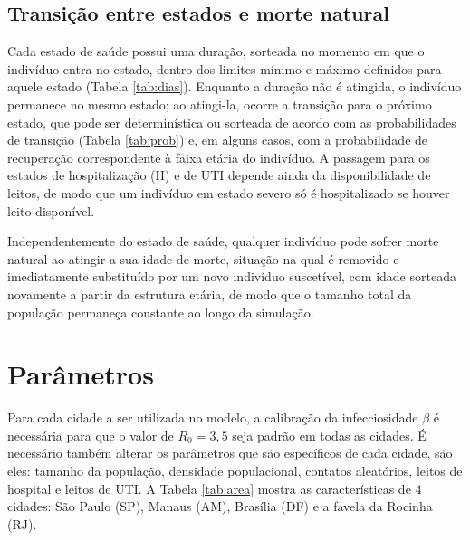 \documentclass[
	12pt,				%
	openright,			%
	oneside,			%
	a4paper,			%
	english,			%
	french,				%
	spanish,			%
	brazil				%
	]{abntex2}
\begin{document}
\subsection{Transição entre estados e morte natural}

Cada estado de saúde possui uma duração, sorteada no momento em que o indivíduo entra no estado, dentro dos limites mínimo e máximo definidos para aquele estado (Tabela \ref{tab:dias}). Enquanto a duração não é atingida, o indivíduo permanece no mesmo estado; ao atingi-la, ocorre a transição para o próximo estado, que pode ser determinística ou sorteada de acordo com as probabilidades de transição (Tabela \ref{tab:prob}) e, em alguns casos, com a probabilidade de recuperação correspondente à faixa etária do indivíduo. A passagem para os estados de hospitalização (H) e de UTI depende ainda da disponibilidade de leitos, de modo que um indivíduo em estado severo só é hospitalizado se houver leito disponível.

Independentemente do estado de saúde, qualquer indivíduo pode sofrer morte natural ao atingir a sua idade de morte, situação na qual é removido e imediatamente substituído por um novo indivíduo suscetível, com idade sorteada novamente a partir da estrutura etária, de modo que o tamanho total da população permaneça constante ao longo da simulação.

\section{Parâmetros}
Para cada cidade a ser utilizada no modelo, a calibração da infecciosidade $\beta$ é necessária para que o valor de $R_0 = 3{,}5$ seja padrão em todas as cidades. É necessário também alterar os parâmetros que são específicos de cada cidade, são eles: tamanho da população, densidade populacional, contatos aleatórios, leitos de hospital e leitos de UTI. A Tabela \ref{tab:area} mostra as características de 4 cidades: São Paulo (SP), Manaus (AM), Brasília (DF) e a favela da Rocinha (RJ).
\end{document}
